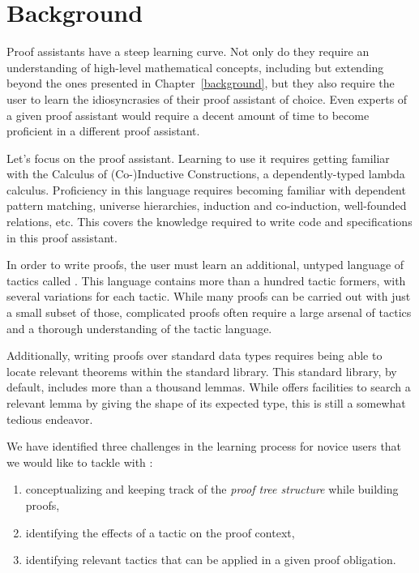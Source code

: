 \section{Background}

Proof assistants have a steep learning curve.  Not only do they require an
understanding of high-level mathematical concepts, including but extending
beyond the ones presented in Chapter~\ref{background}, but they also require the
user to learn the idiosyncrasies of their proof assistant of choice.  Even
experts of a given proof assistant would require a decent amount of time to
become proficient in a different proof assistant.

Let's focus on the \Coq{} proof assistant.  Learning to use it requires getting
familiar with the Calculus of (Co-)Inductive Constructions, a dependently-typed
lambda calculus.  Proficiency in this language requires becoming familiar with
dependent pattern matching, universe hierarchies, induction and co-induction,
well-founded relations, etc.  This covers the knowledge required to write code
and specifications in this proof assistant.

In order to write proofs, the user must learn an additional, untyped language of
tactics called \Ltac{}.  This language contains more than a hundred tactic
formers, with several variations for each tactic.  While many proofs can be
carried out with just a small subset of those, complicated proofs often require
a large arsenal of tactics and a thorough understanding of the tactic language.

Additionally, writing proofs over standard data types requires being able to
locate relevant theorems within the standard library.  This standard library,
by default, includes more than a thousand lemmas.  While \Coq{} offers facilities
to search a relevant lemma by giving the shape of its expected type, this is still
a somewhat tedious endeavor.

We have identified three challenges in the learning process for novice users
that we would like to tackle with \PeaCoq{}:

\begin{enumerate}

  \item conceptualizing and keeping track of the \emph{proof tree structure}
while building proofs,

  \item identifying the effects of a tactic on the proof context,

  \item identifying relevant tactics that can be applied in a given proof
obligation.

\end{enumerate}
